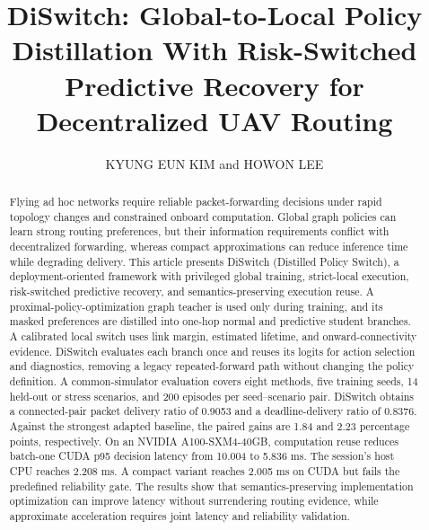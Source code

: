 \documentclass{ieeeaccess}
\begin{document}

\title{DiSwitch: Global-to-Local Policy Distillation With Risk-Switched Predictive Recovery for Decentralized UAV Routing}
\author{\uppercase{Kyung Eun Kim} and \uppercase{Howon Lee}}
\address[1]{Department of Military Digital Convergence, Ajou University, Suwon 16499, Republic of Korea}

\begin{abstract}
Flying ad hoc networks require reliable packet-forwarding decisions under rapid topology changes and constrained onboard computation. Global graph policies can learn strong routing preferences, but their information requirements conflict with decentralized forwarding, whereas compact approximations can reduce inference time while degrading delivery. This article presents DiSwitch (Distilled Policy Switch), a deployment-oriented framework with privileged global training, strict-local execution, risk-switched predictive recovery, and semantics-preserving execution reuse. A proximal-policy-optimization graph teacher is used only during training, and its masked preferences are distilled into one-hop normal and predictive student branches. A calibrated local switch uses link margin, estimated lifetime, and onward-connectivity evidence. DiSwitch evaluates each branch once and reuses its logits for action selection and diagnostics, removing a legacy repeated-forward path without changing the policy definition. A common-simulator evaluation covers eight methods, five training seeds, 14 held-out or stress scenarios, and 200 episodes per seed--scenario pair. DiSwitch obtains a connected-pair packet delivery ratio of 0.9053 and a deadline-delivery ratio of 0.8376. Against the strongest adapted baseline, the paired gains are 1.84 and 2.23 percentage points, respectively. On an NVIDIA A100-SXM4-40GB, computation reuse reduces batch-one CUDA p95 decision latency from 10.004 to 5.836 ms. The session's host CPU reaches 2.208 ms. A compact variant reaches 2.005 ms on CUDA but fails the predefined reliability gate. The results show that semantics-preserving implementation optimization can improve latency without surrendering routing evidence, while approximate acceleration requires joint latency and reliability validation.
\end{abstract}
\end{document}
